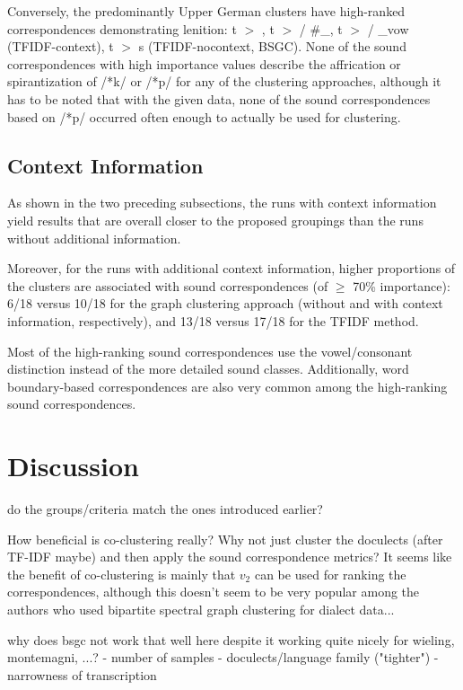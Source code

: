 \documentclass[a4paper]{article}
\begin{document}
Conversely, the predominantly Upper German clusters
have high-ranked correspondences demonstrating lenition:
t $>$ , t $>$  / \#\_,
t $>$  / \_vow (TFIDF-context),
t $>$ s (TFIDF-nocontext, BSGC).
None of the sound correspondences with high importance values
describe the affrication or spirantization of /*k/ or /*p/
for any of the clustering approaches,
although it has to be noted that with the given data,
none of the sound correspondences based on /*p/
occurred often enough to actually be used for clustering.

\subsection{Context Information}

As shown in the two preceding subsections,
the runs with context information yield results
that are overall closer to the proposed groupings
than the runs without additional information.

Moreover, for the runs with additional context information,
higher proportions of the clusters are associated with
sound correspondences (of $\geq$ 70\% importance):
6/18 versus 10/18 for the graph clustering approach
(without and with context information, respectively),
and 13/18 versus 17/18 for the TFIDF method.

Most of the high-ranking sound correspondences
use the vowel/consonant distinction instead of
the more detailed sound classes.
Additionally, word boundary-based correspondences are also very common
among the high-ranking sound correspondences.

\section{Discussion}
\label{sec:discussion}

do the groups/criteria match the ones introduced earlier?

How beneficial is co-clustering really? Why not just cluster the doculects (after TF-IDF maybe) and then apply the sound correspondence metrics? It seems like the benefit of co-clustering is mainly that $v_2$ can be used for ranking the correspondences, although this doesn't seem to be very popular among the authors who used bipartite spectral graph clustering for dialect data...

why does bsgc not work that well here despite it working quite nicely for wieling, montemagni, ...?
- number of samples
- doculects/language family ("tighter")
- narrowness of transcription
\end{document}
